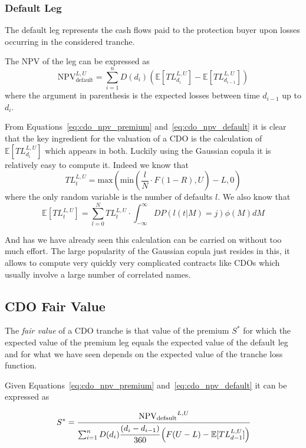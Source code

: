 \subsubsection{Default Leg}
The default leg represents the cash flows paid to the protection buyer upon losses occurring in the considered tranche. 

The NPV of the leg can be expressed as
\begin{equation}
\mathrm{NPV}_{\mathrm{default}}^{L,U}=\sum_{i=1}^{n}D(d_i)\left(\mathbb{E}[TL_{d_i}^{L,U}]-\mathbb{E}[TL_{d_{i-1}}^{L,U}]\right)
\label{eq:cdo_npv_default}
\end{equation}
where the argument in parenthesis is the expected losses between time $d_{i-1}$ up to $d_i$. 

From Equations~\ref{eq:cdo_npv_premium} and~\ref{eq:cdo_npv_default} it is clear that the key ingredient for the valuation of a CDO is the calculation of $\mathbb{E}[TL_{d_i}^{L,U}]$ which appears in both.
Luckily using the Gaussian copula it is relatively easy to compute it. Indeed we know that 
\begin{equation}
TL_{t}^{L,U}=\mathrm{max}(\mathrm{min}(\frac{l}{N}\cdot F(1-R), U)-L, 0)
\label{eq:tl}
\end{equation}
where the only random variable is the number of defaults $l$. We also know that 
\begin{equation}
\mathbb{E}[TL_{t}^{L,U}] = \sum_{l=0}^{N}TL_{t}^{L,U}\cdot \int_{-\infty}^{\infty} DP(l(t|M)=j) \phi(M)dM
\label{eq:etl}
\end{equation}

And has we have already seen this calculation can be carried on without too much effort.
The large popularity of the Gaussian copula just resides in this, it allows to compute very quickly very complicated contracts like CDOs which usually involve a large number of correlated names.

\subsection{CDO Fair Value}
The \emph{fair value} of a CDO tranche is that value of the premium $S^*$ for which the expected value of the premium leg equals the expected value of the default leg and for what we have seen depends on the expected value of the tranche loss function.

Given Equations~\ref{eq:cdo_npv_premium} and~\ref{eq:cdo_npv_default} it can be expressed as

\begin{equation}
S^* = \cfrac{\mathrm{NPV_{default}}^{L,U}}{\sum^{n}_{i=1}D(d_i)\cfrac{(d_i - d_{i-1})}{360}\left(F(U-L)-\mathbb{E}[TL_{d-1}^{L,U}]\right)}
\label{eq:cdo_fair_value}
\end{equation}

